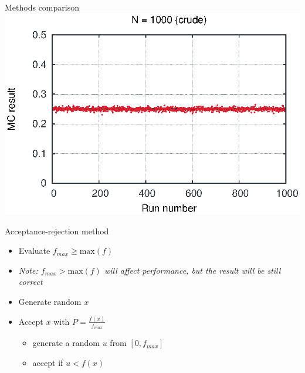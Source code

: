 \begin{emptyslide}{Methods comparison}
{    \includegraphics[width=\columnwidth]{img/int21000.eps}
  }

\vfill\null
\end{emptyslide}


\begin{slide}[toc=Accept-reject]{Acceptance-rejection method}
\null\vfill

  \twocolumn
  {
    
    \begin{itemize}
      \item Evaluate $f_{max} \geq \mbox{max}(f)$
      \item[] {\it\color{pdcolor3}Note: $f_{max} > \mbox{max}(f)$ will affect performance, but the result will be still correct}
      \item Generate random $x$
      \item Accept $x$ with $P = \frac{f(x)}{f_{max}}$
      \begin{itemize}
	\item generate a random $u$ from $[0, f_{max}]$
	\item accept if $u < f(x)$
      \end{itemize}
    \end{itemize}
  }
  {
    
    
  }

\vfill\null
\end{slide}


